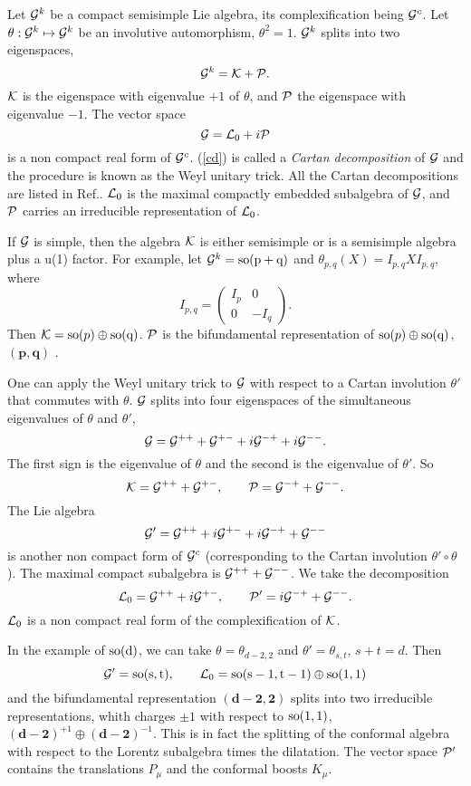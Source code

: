 \documentclass[a4paper,12pt]{article}
\begin{document}
Let $\mathcal{G}^k$ be a compact semisimple Lie algebra, its
complexification being $\mathcal{G}^c$. Let $\theta:\mathcal{G}^k\mapsto \mathcal{G}^k$ be an
involutive automorphism, $\theta^2=1$. $\mathcal{G}^k$ splits into two
eigenspaces, $$\mathcal{G}^k=\mathcal{K}+\mathcal{P}.$$ $\mathcal{K}$ is the eigenspace with
eigenvalue $+1$ of $\theta$, and $\mathcal{P}$ the eigenspace with
eigenvalue $-1$. The vector space
\begin{equation}\mathcal{G}=\mathcal{L}_0+i\mathcal{P}\label{cd}\end{equation} is a non
compact real form of $\mathcal{G}^c$. (\ref{cd}) is called a {\it Cartan
decomposition} of $\mathcal{G}$ and the procedure is known as the Weyl
unitary trick. All the Cartan decompositions are listed in
Ref.\cite{he}. $\mathcal{L}_0$ is the maximal compactly embedded
subalgebra of $\mathcal{G}$, and $\mathcal{P}$ carries an irreducible representation
of $\mathcal{L}_0$.

If $\mathcal{G}$ is simple, then the algebra $\mathcal{K}$ is either semisimple or
is a semisimple algebra plus  a u(1) factor. For example, let
$\mathcal{G}^k=\rm{so}(p+q)$ and $\theta_{p,q}(X)=I_{p,q}XI_{p,q}$, where
$$I_{p,q}=\begin{pmatrix}I_p&0\\0& -I_q\end{pmatrix}.$$ Then
$\mathcal{K}={\rm so}(p)\oplus \rm{so}(q)$. $\mathcal{P}$ is the bifundamental
representation of ${\rm so}(p)\oplus \rm{so}(q)$,
$(\mathbf{p,q})$ .

One can apply  the Weyl unitary trick  to $\mathcal{G}$ with respect to a
Cartan involution $\theta'$ that commutes with $\theta$. $\mathcal{G}$
splits into four eigenspaces of the simultaneous eigenvalues of
$\theta$ and $\theta'$, $$\mathcal{G}=\mathcal{G}^{++}+\mathcal{G}^{+-}+i\mathcal{G}^{-+}+i\mathcal{G}^{--}.$$
The first sign is the eigenvalue of $\theta$ and the second is the
eigenvalue of $\theta'$. So $$\mathcal{K}=\mathcal{G}^{++}+\mathcal{G}^{+-}, \qquad
\mathcal{P}=\mathcal{G}^{-+}+\mathcal{G}^{--}.$$ The Lie algebra
$$\mathcal{G}'=\mathcal{G}^{++}+i\mathcal{G}^{+-}+i\mathcal{G}^{-+}+\mathcal{G}^{--}$$ is another non compact
form of $\mathcal{G}^c$ (corresponding to the Cartan involution
$\theta'\circ\theta$). The maximal compact subalgebra is
$\mathcal{G}^{++}+\mathcal{G}^{--}$. We take the decomposition
$$\mathcal{L}_0=\mathcal{G}^{++}+i\mathcal{G}^{+-},\qquad \mathcal{P}'=i\mathcal{G}^{-+}+\mathcal{G}^{--}.$$ $\mathcal{L}_0$ is
a non compact real form of the complexification of $\mathcal{K}$.

In the  example  of $\rm{so}(d)$, we can take
$\theta=\theta_{d-2,2}$ and $\theta'=\theta_{s,t}$, $s+t=d$. Then
$$\mathcal{G}'=\rm{so}(s,t), \qquad
\mathcal{L}_0=\rm{so}(s-1,t-1)\oplus\rm{so}(1,1)$$ and the bifundamental
 representation $(\mathbf{d-2,2})$ splits into two irreducible
 representations, whith charges $\pm1$ with respect to
 $\rm{so}(1,1)$, $(\mathbf{d-2})^{+1}\oplus(\mathbf{d-2})^{-1}$. This is in fact
 the splitting of the conformal algebra with respect to the
 Lorentz subalgebra times the dilatation. The vector space $\mathcal{P}'$
 contains the translations $P_\mu$ and the conformal boosts
 $K_\mu$.
\end{document}
